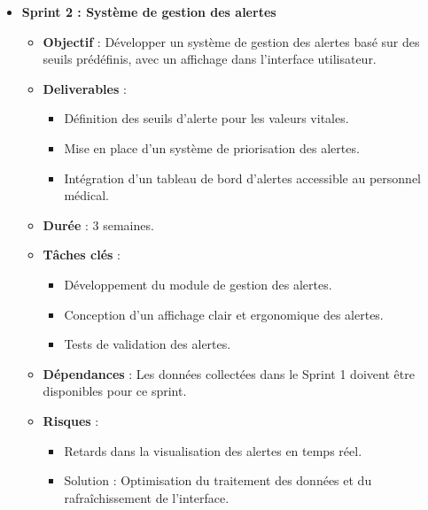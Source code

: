 \begin{itemize}
    \item \textbf{Sprint 2 : Système de gestion des alertes}
    \begin{itemize}
        \item \textbf{Objectif} : Développer un système de gestion des alertes basé sur des seuils prédéfinis, avec un affichage dans l'interface utilisateur.
        \item \textbf{Deliverables} :
            \begin{itemize}
                \item Définition des seuils d'alerte pour les valeurs vitales.
                \item Mise en place d'un système de priorisation des alertes.
                \item Intégration d’un tableau de bord d’alertes accessible au personnel médical.
            \end{itemize}
        \item \textbf{Durée} : 3 semaines.
        \item \textbf{Tâches clés} :
            \begin{itemize}
                \item Développement du module de gestion des alertes.
                \item Conception d’un affichage clair et ergonomique des alertes.
                \item Tests de validation des alertes.
            \end{itemize}
        \item \textbf{Dépendances} : Les données collectées dans le Sprint 1 doivent être disponibles pour ce sprint.
        \item \textbf{Risques} :
            \begin{itemize}
                \item Retards dans la visualisation des alertes en temps réel.
                \item Solution : Optimisation du traitement des données et du rafraîchissement de l’interface.
            \end{itemize}
    \end{itemize}
\end{itemize}
